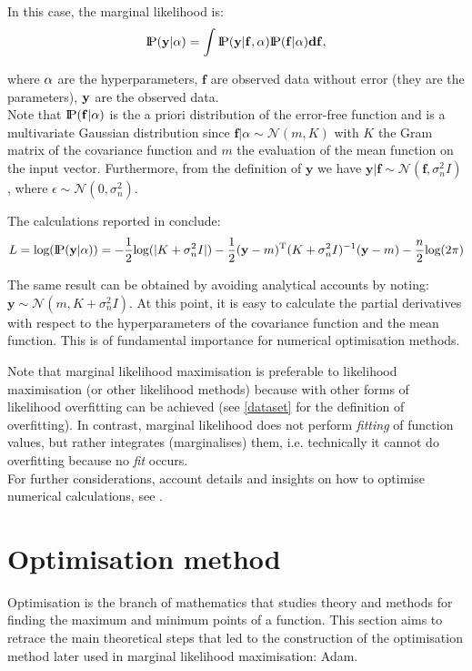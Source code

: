 In this case, the marginal likelihood is:
\[
\text{I\kern-0.18em P}(\bf{y}|\bf{\alpha}) = \int \text{I\kern-0.18em P}(\bf{y}| \mathbf{f},\bf{\alpha})\text{I\kern-0.18em P}(\mathbf{f}|\bf{\alpha}) d\mathbf{f},
\]

where $\bf{\alpha}$ are the hyperparameters, $\mathbf{f}$ are observed data without error (they are the parameters), $\bf{y}$ are the observed data.\\
Note that $\text{I\kern-0.18em P}(\mathbf{f}|\bf{\alpha})$ is the a priori distribution of the error-free function and is a multivariate Gaussian distribution since $\mathbf{f}|\alpha\sim \mathcal{N}(m, K)$ with $K$ the Gram matrix of the covariance function and $m$ the evaluation of the mean function on the input vector. Furthermore, from the definition of $\mathbf{y}$ we have $\mathbf{y}|\mathbf{f}\sim \mathcal{N}(\mathbf{f}, \sigma_n^2I)$, where $\epsilon\sim \mathcal{N}(0,\sigma_n^2)$.

\newpage

The calculations reported in \cite{rasmussen_gaussian_2006} conclude:
\[
L=\text{log}(\text{I\kern-0.18em P}(\mathbf{y}|\alpha))=-\frac{1}{2}\text{log}(|K+\sigma_n^2I|)-\frac{1}{2}(\mathbf{y}-m)^{\text{T}}(K+\sigma_n^2I)^{-1}(\mathbf{y}-m)-\frac{n}{2}\text{log}(2\pi)
\]

The same result can be obtained by avoiding analytical accounts by noting: $\mathbf{y}\sim \mathcal{N}(m, K+\sigma_n^2I)$. At this point, it is easy to calculate the partial derivatives with respect to the hyperparameters of the covariance function and the mean function. This is of fundamental importance for numerical optimisation methods.

Note that marginal likelihood maximisation is preferable to likelihood maximisation (or other likelihood methods) because with other forms of likelihood overfitting can be achieved (see \ref{dataset} for the definition of overfitting). In contrast, marginal likelihood does not perform \textit{fitting} of function values, but rather integrates (marginalises) them, i.e. technically it cannot do overfitting because no \textit{fit} occurs. \\

For further considerations, account details and insights on how to optimise numerical calculations, see \cite{rasmussen_gaussian_2006}.




\section{Optimisation method}
Optimisation is the branch of mathematics that studies theory and methods for finding the maximum and minimum points of a function. This section aims to retrace the main theoretical steps that led to the construction of the optimisation method later used in marginal likelihood maximisation: Adam.

